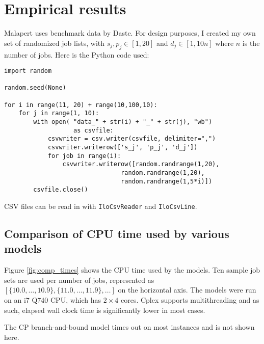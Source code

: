 \newpage
\section{Empirical results}
Malapert uses benchmark data by Daste. For design purposes, I created my own set of randomized job lists, with $s_j, p_j \in [1, 20]$ and $d_j \in [1, 10n]$ where $n$ is the number of jobs. Here is the Python code used:

\lstset{language=Python}
\begin{lstlisting}
import random

random.seed(None)

for i in range(11, 20) + range(10,100,10):
    for j in range(1, 10):
        with open( "data_" + str(i) + "_" + str(j), "wb")
                   as csvfile:
            csvwriter = csv.writer(csvfile, delimiter=",")
            csvwriter.writerow(['s_j', 'p_j', 'd_j'])
            for job in range(i):
                csvwriter.writerow([random.randrange(1,20),
                                random.randrange(1,20),
                                random.randrange(1,5*i)])
        csvfile.close()
\end{lstlisting}

CSV files can be read in with \texttt{IloCsvReader} and \texttt{IloCsvLine}.

\subsection{Comparison of CPU time used by various models}
Figure \ref{fig:comp_times} shows the CPU time used by the models. Ten sample
job sets are used per number of jobs, represented as $\left[\{10.0, \dots, 10.9\},
\{11.0, \dots, 11.9\},\dots \right]$ on the horizontal axis. The models were run
on an i7 Q740 CPU, which has $2 \times 4$ cores. Cplex supports multithreading
and as such, elapsed wall clock time is significantly lower in most cases.


The CP branch-and-bound model times out on most instances and is not shown here.

